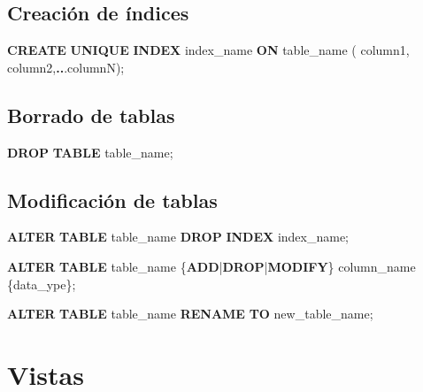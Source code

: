 \documentclass[
]{book}
\newenvironment{Shaded}{\begin{snugshade}}{\end{snugshade}}
\newcommand{\KeywordTok}[1]{\textcolor[rgb]{0.13,0.29,0.53}{\textbf{#1}}}
\newcommand{\NormalTok}[1]{#1}
\newcommand{\OperatorTok}[1]{\textcolor[rgb]{0.81,0.36,0.00}{\textbf{#1}}}
\theoremstyle{break}
\theoremstyle{nonumberplain}
\begin{document}
\subsection{Creación de índices}\label{creaciuxf3n-de-uxedndices}

\begin{Shaded}
\begin{Highlighting}[]
\KeywordTok{CREATE} \KeywordTok{UNIQUE} \KeywordTok{INDEX}\NormalTok{ index\_name}
\KeywordTok{ON}\NormalTok{ table\_name ( column1, column2,}\OperatorTok{..}\NormalTok{.columnN);}
\end{Highlighting}
\end{Shaded}

\subsection{Borrado de tablas}\label{borrado-de-tablas}

\begin{Shaded}
\begin{Highlighting}[]
\KeywordTok{DROP} \KeywordTok{TABLE}\NormalTok{ table\_name;}
\end{Highlighting}
\end{Shaded}

\subsection{Modificación de tablas}\label{modificaciuxf3n-de-tablas}

\begin{Shaded}
\begin{Highlighting}[]
\KeywordTok{ALTER} \KeywordTok{TABLE}\NormalTok{ table\_name}
\KeywordTok{DROP} \KeywordTok{INDEX}\NormalTok{ index\_name;}

\KeywordTok{ALTER} \KeywordTok{TABLE}\NormalTok{ table\_name}
\NormalTok{\{}\KeywordTok{ADD}\NormalTok{|}\KeywordTok{DROP}\NormalTok{|}\KeywordTok{MODIFY}\NormalTok{\} column\_name \{data\_ype\};}

\KeywordTok{ALTER} \KeywordTok{TABLE}\NormalTok{ table\_name }\KeywordTok{RENAME} \KeywordTok{TO}\NormalTok{ new\_table\_name;}
\end{Highlighting}
\end{Shaded}

\section{Vistas}\label{vistas}
\end{document}
